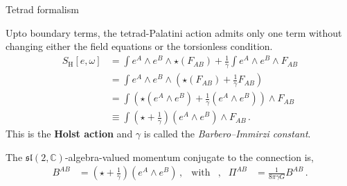 \documentclass[12pt,titlepage]{article}
\begin{document}
\begin{frame}{Tetrad formalism}
    \begin{list}{\,}{\leftmargin=1em \itemindent=0em}
        \item<1-> Upto boundary terms, the tetrad-Palatini action admits only one term without changing either the field equations or the torsionless condition.
        \begin{align}
            S_\text{H}[e,\omega]&=\int e^A\wedge e^B\wedge\star(F_{AB})+ \frac{1}{\gamma}\int e^A\wedge e^B\wedge F_{AB}\\
            &=\int e^A\wedge e^B\wedge\left(\star(F_{AB})+\frac{1}{\gamma} F_{AB}\right)\\
            &=\int\left(\star(e^A\wedge e^B)+\frac{1}{\gamma}(e^A\wedge e^B)\right)\wedge F_{AB}\\
            &\equiv\int\left(\star+\frac{1}{\gamma}\right)(e^A\wedge e^B)\wedge F_{AB}\,.
        \end{align}
        This is the \textbf{Holst action} and $\gamma$ is called the \textit{Barbero–Immirzi constant}.
        \item<2-> The $\mathfrak{sl}(2,\mathbb{C})$-algebra-valued momentum conjugate to the connection is,
        \begin{align}\label{b_mom_conj}
            B^{AB}&=\left(\star+\frac{1}{\gamma}\right)(e^A\wedge e^B)\,, &\text{with}&, &\Pi^{AB}&=\frac{1}{8\pi\gamma G}B^{AB}\,.
        \end{align}
    \end{list}
\end{frame}
\end{document}
